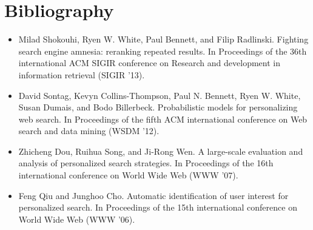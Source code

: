 \documentclass[11pt]{article}
\begin{document}
\section{Bibliography}
\begin{itemize}
\item Milad Shokouhi, Ryen W. White, Paul Bennett, and Filip Radlinski. Fighting search engine amnesia: reranking repeated results. In Proceedings of the 36th international ACM SIGIR conference on Research and development in information retrieval (SIGIR '13).
\item David Sontag, Kevyn Collins-Thompson, Paul N. Bennett, Ryen W. White, Susan Dumais, and Bodo Billerbeck. Probabilistic models for personalizing web search. In Proceedings of the fifth ACM international conference on Web search and data mining (WSDM '12).
\item Zhicheng Dou, Ruihua Song, and Ji-Rong Wen.  A large-scale evaluation and analysis of personalized search strategies. In Proceedings of the 16th international conference on World Wide Web (WWW '07).
\item Feng Qiu and Junghoo Cho. Automatic identification of user interest for personalized search. In Proceedings of the 15th international conference on World Wide Web (WWW '06).
\end{itemize}
\end{document}

